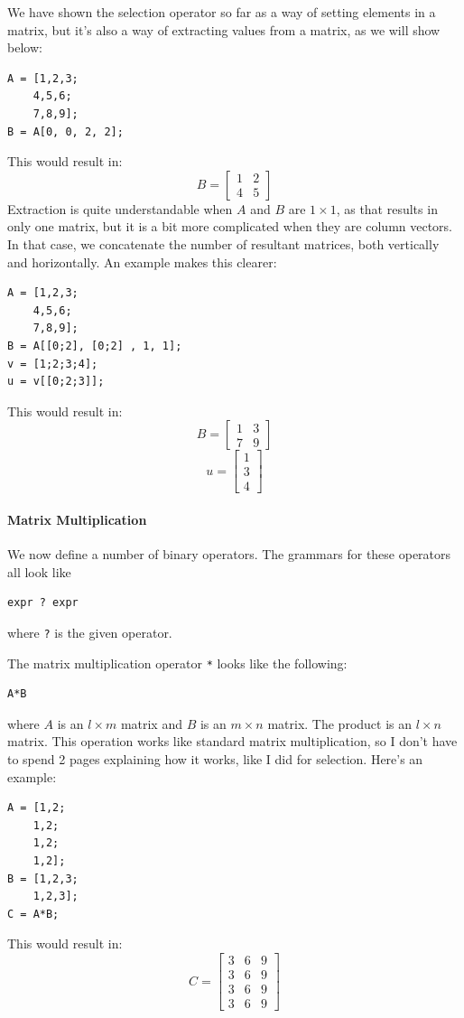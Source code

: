 We have shown the selection operator so far as a way of setting elements in a matrix, but it's also a way of extracting values from a matrix, as we will show below:
\begin{lstlisting}
A = [1,2,3;
    4,5,6;
    7,8,9];
B = A[0, 0, 2, 2];
\end{lstlisting}
This would result in:
$$B=\begin{bmatrix}1 & 2\\4 &5 \end{bmatrix}$$
Extraction is quite understandable when $A$ and $B$ are $1\times 1$, as that results in only one matrix, but it is a bit more complicated when they are column vectors.  In that case, we concatenate the number of resultant matrices, both vertically and horizontally.  An example makes this clearer:
\begin{lstlisting}
A = [1,2,3;
    4,5,6;
    7,8,9];
B = A[[0;2], [0;2] , 1, 1];
v = [1;2;3;4];
u = v[[0;2;3]];
\end{lstlisting}
This would result in:
$$B=\begin{bmatrix}1 & 3\\7 &9 \end{bmatrix}$$
$$u=\begin{bmatrix}1\\3\\4\end{bmatrix}$$

\paragraph{Matrix Multiplication}
We now define a number of binary operators.  The grammars for these operators all look like
\begin{lstlisting}
expr ? expr
\end{lstlisting}
where \verb=?= is the given operator.

The matrix multiplication operator \verb=*= looks like the following:
\begin{lstlisting}
A*B
\end{lstlisting}
where $A$ is an $l\times m$ matrix and $B$ is an $m \times n$ matrix.  The product is an $l \times n$ matrix.  This operation works like standard matrix multiplication, so I don't have to spend 2 pages explaining how it works, like I did for selection.  Here's an example:
\begin{lstlisting}
A = [1,2;
    1,2;
    1,2;
    1,2];
B = [1,2,3;
    1,2,3];
C = A*B;
\end{lstlisting}
This would result in:
$$C=\begin{bmatrix}3 & 6 & 9\\3 & 6 & 9\\3 & 6 & 9\\3 & 6 & 9\end{bmatrix}$$

